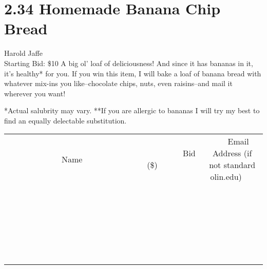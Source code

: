 \documentclass[11pt]{article}
\begin{document}
\section*{2.34 Homemade Banana Chip Bread}
Harold Jaffe
\\
Starting Bid: \$10
\newline
A big ol' loaf of deliciousness! And since it has bananas in it, it's healthy* for you. If you win this item, I will bake a loaf of banana bread with whatever mix-ins you like--chocolate chips, nuts, even raisins--and mail it wherever you want!

*Actual salubrity may vary.
**If you are allergic to bananas I will try my best to find an equally delectable substitution.
\\[6ex]
\begin{tabular}{c c c}
~~~~~~~~~~~~~Name~~~~~~~~~~~~~ & ~~~~~~~~~Bid (\$)~~~~~~~~~  & ~~~Email Address (if not standard olin.edu)~~~\\
 & & \\
\hline
 & & \\
\hline
 & & \\
\hline
 & & \\
\hline
 & & \\
\hline
 & & \\
\hline
 & & \\
\hline
 & & \\
\hline
 & & \\
\hline
 & & \\
\hline
 & & \\
\hline
 & & \\
\hline
 & & \\
\hline
 & & \\
\hline
 & & \\
\hline
 & & \\
\hline
 & & \\
\hline
 & & \\
\hline
 & & \\
\hline
 & & \\
\hline
 & & \\
\hline
 & & \\
\hline
 & & \\
\hline
 & & \\
\hline
 & & \\
\hline
 & & \\
\hline
\end{tabular}
\newpage
\end{document}

